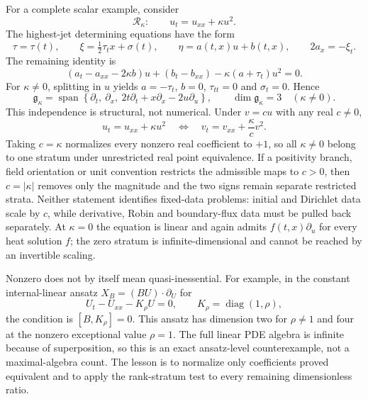 \documentclass[11pt]{article}
\theoremstyle{definition}
\begin{document}
For a complete scalar example, consider
\begin{equation}
 \mathcal R_\kappa:
 \qquad u_t=u_{xx}+\kappa u^2.
 \label{eq:quadratic-reaction}
\end{equation}
The highest-jet determining equations have the form
\begin{equation}
 \tau=\tau(t),\qquad
 \xi=\tfrac12\tau_t x+\sigma(t),\qquad
 \eta=a(t,x)u+b(t,x),
 \qquad 2a_x=-\xi_t.
 \label{eq:quadratic-highest}
\end{equation}
The remaining identity is
\begin{equation}
 (a_t-a_{xx}-2\kappa b)u+(b_t-b_{xx})
 -\kappa(a+\tau_t)u^2=0.
 \label{eq:quadratic-determining}
\end{equation}
For $\kappa\ne0$, splitting in $u$ yields
$a=-\tau_t$, $b=0$, $\tau_{tt}=0$ and $\sigma_t=0$. Hence
\begin{equation}
 \mathfrak g_\kappa
 =\operatorname{span}\left\{
 \partial_t,\ \partial_x,\
 2t\partial_t+x\partial_x-2u\partial_u
 \right\},
 \qquad \dim\mathfrak g_\kappa=3\quad(\kappa\ne0).
 \label{eq:quadratic-algebra}
\end{equation}
This independence is structural, not numerical. Under $v=cu$ with any real
$c\ne0$,
\[
 u_t=u_{xx}+\kappa u^2
 \quad\Longleftrightarrow\quad
 v_t=v_{xx}+\frac{\kappa}{c}v^2.
\]
Taking $c=\kappa$ normalizes every nonzero real coefficient to $+1$, so all
$\kappa\ne0$ belong to one stratum under unrestricted real point equivalence.
If a positivity branch, field orientation or unit convention restricts the
admissible maps to $c>0$, then $c=|\kappa|$ removes only the magnitude and the
two signs remain separate restricted strata. Neither statement identifies
fixed-data problems: initial and Dirichlet data scale by $c$, while derivative,
Robin and boundary-flux data must be pulled back separately. At $\kappa=0$
the equation is linear and again admits $f(t,x)\partial_u$ for every heat
solution $f$; the zero stratum is infinite-dimensional and cannot be reached
by an invertible scaling.

Nonzero does not by itself mean quasi-inessential. For example, in the
constant internal-linear ansatz $X_B=(BU)\cdot\partial_U$ for
\[
 U_t-U_{xx}-K_\rho U=0,
 \qquad K_\rho=\operatorname{diag}(1,\rho),
\]
the condition is $[B,K_\rho]=0$. This ansatz has dimension two for
$\rho\ne1$ and four at the nonzero exceptional value $\rho=1$. The full
linear PDE algebra is infinite because of superposition, so this is an exact
ansatz-level counterexample, not a maximal-algebra count. The lesson is to
normalize only coefficients proved equivalent and to apply the rank-stratum
test to every remaining dimensionless ratio.
\end{document}
